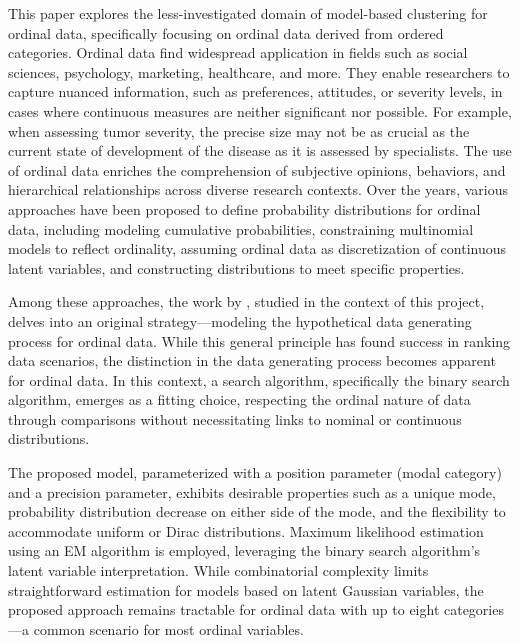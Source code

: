 This paper explores the less-investigated domain of model-based clustering for ordinal data, specifically focusing on ordinal data derived from ordered categories. Ordinal data find widespread application in fields such as social sciences, psychology, marketing, healthcare, and more. They enable researchers to capture nuanced information, such as preferences, attitudes, or severity levels, in cases where continuous measures are neither significant nor possible. For example, when assessing tumor severity, the precise size may not be as crucial as the current state of development of the disease as it is assessed by specialists. The use of ordinal data enriches the comprehension of subjective opinions, behaviors, and hierarchical relationships across diverse research contexts. Over the years, various approaches have been proposed to define probability distributions for ordinal data, including modeling cumulative probabilities, constraining multinomial models to reflect ordinality, assuming ordinal data as discretization of continuous latent variables, and constructing distributions to meet specific properties.

Among these approaches, the work by \cite{biernacki2016model}, studied in the context of this project, delves into an original strategy—modeling the hypothetical data generating process for ordinal data. While this general principle has found success in ranking data scenarios, the distinction in the data generating process becomes apparent for ordinal data. In this context, a search algorithm, specifically the binary search algorithm, emerges as a fitting choice, respecting the ordinal nature of data through comparisons without necessitating links to nominal or continuous distributions.

The proposed model, parameterized with a position parameter (modal category) and a precision parameter, exhibits desirable properties such as a unique mode, probability distribution decrease on either side of the mode, and the flexibility to accommodate uniform or Dirac distributions. Maximum likelihood estimation using an EM algorithm is employed, leveraging the binary search algorithm's latent variable interpretation. While combinatorial complexity limits straightforward estimation for models based on latent Gaussian variables, the proposed approach remains tractable for ordinal data with up to eight categories—a common scenario for most ordinal variables.

